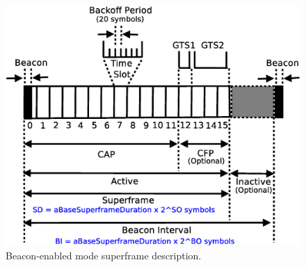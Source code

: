 \documentclass[conference]{IEEEtran}
\begin{document}
\begin{figure}[!htb]
\centering
\includegraphics[scale=.28]{superframe}
\caption{Beacon-enabled mode superframe description.}
\label{fig:superframe}
\end{figure}
\end{document}
